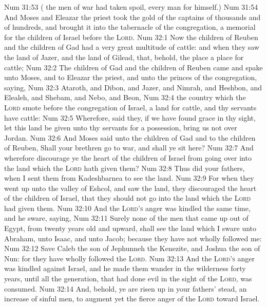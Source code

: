 \vs Num 31:53 ( the men of war had taken spoil, every man for himself.)
\vs Num 31:54 And Moses and Eleazar the priest took the gold of the captains of thousands and of hundreds, and brought it into the tabernacle of the congregation,  a memorial for the children of Israel before the \textsc{Lord}.
\vs Num 32:1 Now the children of Reuben and the children of Gad had a very great multitude of cattle: and when they saw the land of Jazer, and the land of Gilead, that, behold, the place  a place for cattle;
\vs Num 32:2 The children of Gad and the children of Reuben came and spake unto Moses, and to Eleazar the priest, and unto the princes of the congregation, saying,
\vs Num 32:3 Ataroth, and Dibon, and Jazer, and Nimrah, and Heshbon, and Elealeh, and Shebam, and Nebo, and Beon,
\vs Num 32:4  the country which the \textsc{Lord} smote before the congregation of Israel,  a land for cattle, and thy servants have cattle:
\vs Num 32:5 Wherefore, said they, if we have found grace in thy sight, let this land be given unto thy servants for a possession,  bring us not over Jordan.
\vs Num 32:6 And Moses said unto the children of Gad and to the children of Reuben, Shall your brethren go to war, and shall ye sit here?
\vs Num 32:7 And wherefore discourage ye the heart of the children of Israel from going over into the land which the \textsc{Lord} hath given them?
\vs Num 32:8 Thus did your fathers, when I sent them from Kadeshbarnea to see the land.
\vs Num 32:9 For when they went up unto the valley of Eshcol, and saw the land, they discouraged the heart of the children of Israel, that they should not go into the land which the \textsc{Lord} had given them.
\vs Num 32:10 And the \textsc{Lord's} anger was kindled the same time, and he sware, saying,
\vs Num 32:11 Surely none of the men that came up out of Egypt, from twenty years old and upward, shall see the land which I sware unto Abraham, unto Isaac, and unto Jacob; because they have not wholly followed me:
\vs Num 32:12 Save Caleb the son of Jephunneh the Kenezite, and Joshua the son of Nun: for they have wholly followed the \textsc{Lord}.
\vs Num 32:13 And the \textsc{Lord's} anger was kindled against Israel, and he made them wander in the wilderness forty years, until all the generation, that had done evil in the sight of the \textsc{Lord}, was consumed.
\vs Num 32:14 And, behold, ye are risen up in your fathers' stead, an increase of sinful men, to augment yet the fierce anger of the \textsc{Lord} toward Israel.
